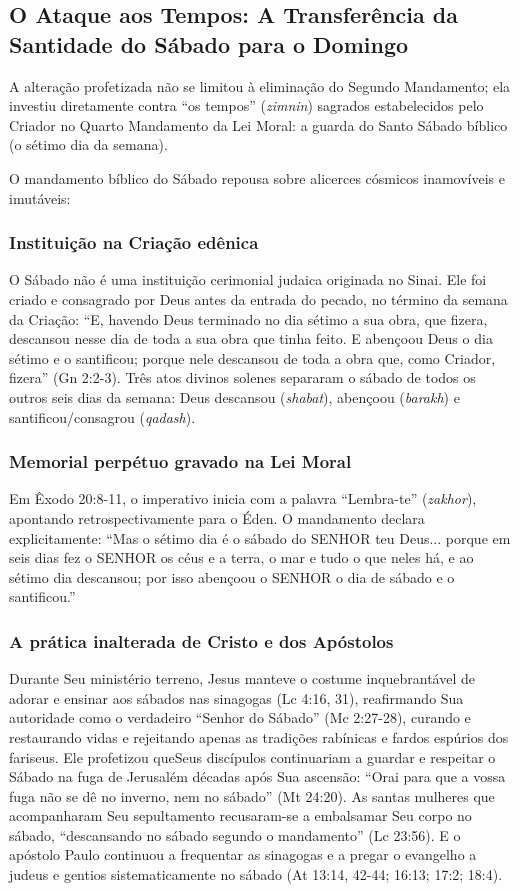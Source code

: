 \documentclass[11pt,a4paper,openany]{book}
\begin{document}
\subsection{O Ataque aos Tempos: A Transferência da Santidade do Sábado para o Domingo}


A alteração profetizada não se limitou à eliminação do Segundo Mandamento; ela investiu diretamente contra ``os tempos'' (\textit{zimnin}) sagrados estabelecidos pelo Criador no Quarto Mandamento da Lei Moral: a guarda do Santo Sábado bíblico (o sétimo dia da semana).

O mandamento bíblico do Sábado repousa sobre alicerces cósmicos inamovíveis e imutáveis:

\subsubsection*{Instituição na Criação edênica}
O Sábado não é uma instituição cerimonial judaica originada no Sinai. Ele foi criado e consagrado por Deus antes da entrada do pecado, no término da semana da Criação: ``E, havendo Deus terminado no dia sétimo a sua obra, que fizera, descansou nesse dia de toda a sua obra que tinha feito. E abençoou Deus o dia sétimo e o santificou; porque nele descansou de toda a obra que, como Criador, fizera'' (Gn 2:2-3). Três atos divinos solenes separaram o sábado de todos os outros seis dias da semana: Deus descansou (\textit{shabat}), abençoou (\textit{barakh}) e santificou/consagrou (\textit{qadash}).

\subsubsection*{Memorial perpétuo gravado na Lei Moral}
Em Êxodo 20:8-11, o imperativo inicia com a palavra ``Lembra-te'' (\textit{zakhor}), apontando retrospectivamente para o Éden. O mandamento declara explicitamente: ``Mas o sétimo dia é o sábado do SENHOR teu Deus... porque em seis dias fez o SENHOR os céus e a terra, o mar e tudo o que neles há, e ao sétimo dia descansou; por isso abençoou o SENHOR o dia de sábado e o santificou.''

\subsubsection*{A prática inalterada de Cristo e dos Apóstolos}
Durante Seu ministério terreno, Jesus manteve o costume inquebrantável de adorar e ensinar aos sábados nas sinagogas (Lc 4:16, 31), reafirmando Sua autoridade como o verdadeiro ``Senhor do Sábado'' (Mc 2:27-28), curando e restaurando vidas e rejeitando apenas as tradições rabínicas e fardos espúrios dos fariseus. Ele profetizou queSeus discípulos continuariam a guardar e respeitar o Sábado na fuga de Jerusalém décadas após Sua ascensão: ``Orai para que a vossa fuga não se dê no inverno, nem no sábado'' (Mt 24:20). As santas mulheres que acompanharam Seu sepultamento recusaram-se a embalsamar Seu corpo no sábado, ``descansando no sábado segundo o mandamento'' (Lc 23:56). E o apóstolo Paulo continuou a frequentar as sinagogas e a pregar o evangelho a judeus e gentios sistematicamente no sábado (At 13:14, 42-44; 16:13; 17:2; 18:4).
\end{document}
